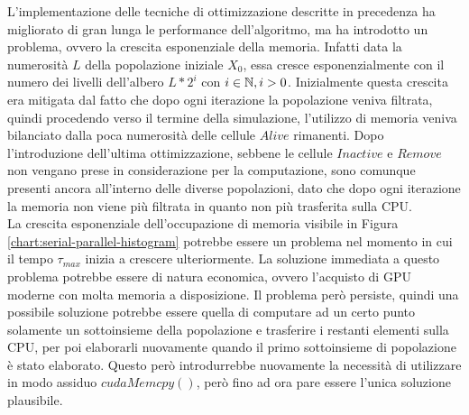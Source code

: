 L'implementazione delle tecniche di ottimizzazione descritte in precedenza
ha migliorato di gran lunga
le performance dell'algoritmo, ma ha introdotto un problema, ovvero la crescita
esponenziale della memoria.
Infatti data la numerosità $L$ della popolazione iniziale $X_{0}$, essa cresce
esponenzialmente con il numero dei livelli dell'albero $L * 2^i$ con
$i \in \mathbb{N}, i > 0$. Inizialmente questa crescita era mitigata dal fatto che
dopo ogni iterazione la popolazione veniva filtrata, quindi procedendo verso
il termine della simulazione, l'utilizzo di memoria veniva bilanciato dalla
poca numerosità delle cellule $Alive$ rimanenti.
Dopo l'introduzione dell'ultima ottimizzazione, sebbene le cellule $Inactive$ e
$Remove$ non vengano prese in considerazione per la computazione, sono
comunque presenti ancora all'interno delle diverse popolazioni, dato che
dopo ogni iterazione la memoria non viene più filtrata in quanto non più
trasferita sulla CPU.
\\
La crescita esponenziale dell'occupazione di memoria visibile in Figura
\ref{chart:serial-parallel-histogram} potrebbe essere un
problema nel momento in cui il tempo $\tau_{max}$ inizia a crescere
ulteriormente. La soluzione immediata a questo problema potrebbe essere di
natura economica, ovvero l'acquisto di GPU moderne con molta memoria a
disposizione. Il problema però persiste, quindi una possibile soluzione
potrebbe essere quella di computare ad un certo punto solamente un sottoinsieme
della popolazione e trasferire i restanti elementi sulla CPU, per poi
elaborarli nuovamente quando il primo sottoinsieme di popolazione è stato
elaborato. Questo però introdurrebbe nuovamente la necessità di utilizzare
in modo assiduo $cudaMemcpy()$, però fino ad ora pare essere l'unica soluzione
plausibile.
